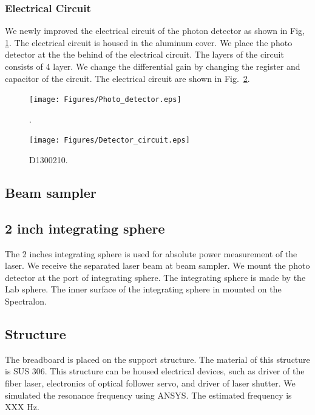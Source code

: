 \subsubsection{Electrical Circuit}
We newly improved the electrical circuit of the photon detector as shown in Fig, \ref{fig:Photo_detector}. The electrical circuit is housed in the aluminum cover. We place the photo detector at the the behind of the electrical circuit. The layers of the circuit consists of 4 layer. We change the differential gain by changing the register and capacitor of the circuit. The electrical circuit are shown in Fig.~\ref{fig:Detector_circuit}.
\begin{figure}
\begin{center}
\texttt{[image: Figures/Photo\_detector.eps]}
\caption{.} 
\label{fig:Photo_detector} 
\end{center}
\end{figure}
\begin{figure}
\begin{center}
\texttt{[image: Figures/Detector\_circuit.eps]}
\caption{D1300210.} 
\label{fig:Detector_circuit} 
\end{center}
\end{figure}

\subsection{Beam sampler}
\subsection{2 inch integrating sphere}
The 2 inches integrating sphere is used for absolute power measurement of the laser. We receive the separated laser beam at beam sampler. We mount the photo detector at the port of integrating sphere. The integrating sphere is made by the Lab sphere. The inner surface of the integrating sphere in mounted on the Spectralon.

\subsection{Structure}
The breadboard is placed on the support structure. The material of this structure is SUS 306. This structure can be housed electrical devices, such as driver of the fiber laser, electronics of optical follower servo, and driver of laser shutter. We simulated the resonance frequency using ANSYS. The estimated frequency is XXX Hz.

